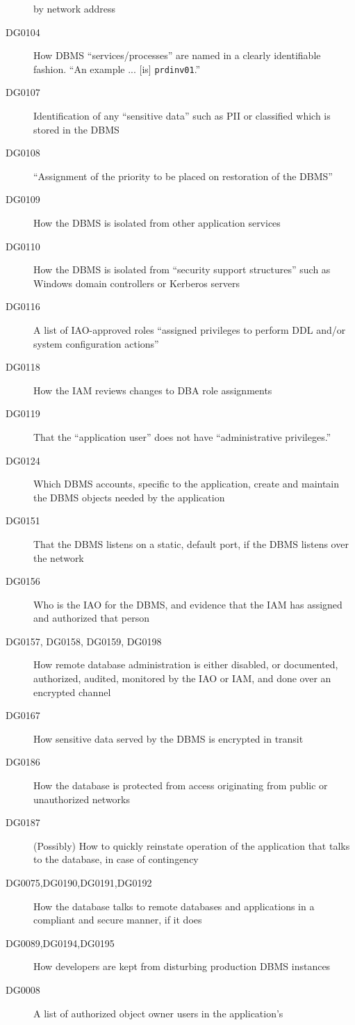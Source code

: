 \begin{description}
by network address
\item[DG0104] How DBMS ``services/processes'' are named in a clearly
identifiable fashion. ``An example ... [is] \verb!prdinv01!.''
\item[DG0107] Identification of any ``sensitive data'' such as PII or
classified which is stored in the DBMS
\item[DG0108] ``Assignment of the priority to be placed on restoration of
the DBMS''
\item[DG0109] How the DBMS is isolated from other application services
\item[DG0110] How the DBMS is isolated from ``security support
structures'' such as Windows domain controllers or Kerberos servers
\item[DG0116] A list of IAO-approved roles ``assigned privileges to
perform DDL and/or system configuration actions''
\item[DG0118] How the IAM reviews changes to DBA role assignments
\item[DG0119] That the ``application user'' does not have ``administrative
privileges.''
\item[DG0124] Which DBMS accounts, specific to the application, create and
maintain the DBMS objects needed by the application
\item[DG0151] That the DBMS listens on a static, default port, if the DBMS
listens over the network
\item[DG0156] Who is the IAO for the DBMS, and evidence that the IAM has
assigned and authorized that person
\item[DG0157, DG0158, DG0159, DG0198] How remote database administration
is either disabled, or documented, authorized, audited, monitored by the
IAO or IAM, and done over an encrypted channel
\item[DG0167] How sensitive data served by the DBMS is encrypted in
transit
\item[DG0186] How the database is protected from access originating from
public or unauthorized networks
\item[DG0187] (Possibly) How to quickly reinstate operation of the
application that talks to the database, in case of contingency
\item[DG0075,DG0190,DG0191,DG0192] How the database talks to remote
databases and applications in a compliant and secure manner, if it does
\item[DG0089,DG0194,DG0195] How developers are kept from disturbing
production DBMS instances
\item[DG0008] A list of authorized object owner users in the application's

\end{description}
